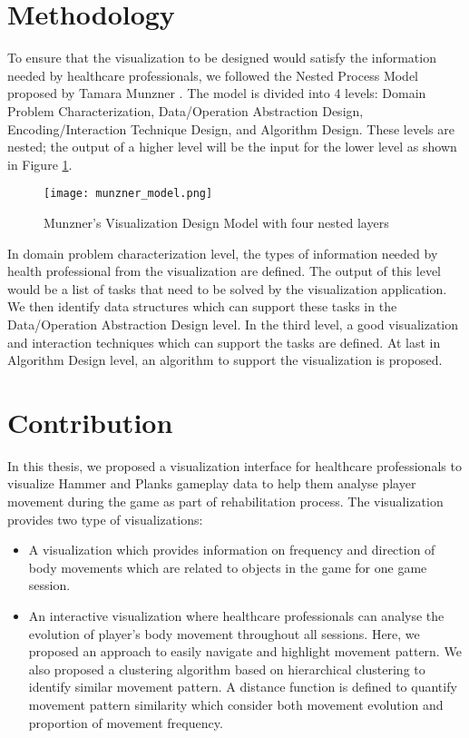 \section{Methodology}

To ensure that the visualization to be designed would satisfy the information needed by healthcare professionals, we followed the Nested Process Model proposed by Tamara Munzner \cite{Munzner:2009:NMV:1638611.1639181}. The model is divided into 4 levels: Domain Problem Characterization, Data/Operation Abstraction Design, Encoding/Interaction Technique Design, and Algorithm Design. These levels are nested; the output of a higher level will be the input for the lower level as shown in Figure \ref{munzner_model}.

\begin{figure}[H]
\centering
\texttt{[image: munzner\_model.png]}
\caption{Munzner's Visualization Design Model with four nested layers \label{munzner_model}}
\end{figure}

In domain problem characterization level, the types of information needed by health professional from the visualization are defined. The output of this level would be a list of tasks that need to be solved by the visualization application. We then identify data structures which can support these tasks in the Data/Operation Abstraction Design level. In the third level, a good visualization and interaction techniques which can support the tasks are defined. At last in Algorithm Design level, an algorithm to support the visualization is proposed.

\section{Contribution}
In this thesis, we proposed a visualization interface for healthcare professionals to visualize Hammer and Planks gameplay data to help them analyse player movement during the game as part of rehabilitation process. The visualization provides two type of visualizations:
\begin{itemize}
\item A visualization which provides information on frequency and direction of body movements which are related to objects in the game for one game session.
\item An interactive visualization where healthcare professionals can analyse the evolution of player's body movement throughout all sessions. Here, we proposed an approach to easily navigate and highlight movement pattern. We also proposed a clustering algorithm based on hierarchical clustering to identify similar movement pattern. A distance function is defined to quantify movement pattern similarity which consider both movement evolution and proportion of movement frequency.
\end{itemize}

